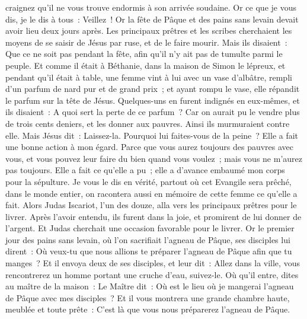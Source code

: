 \begin{multicols}{2}
craignez qu'il ne vous trouve endormis à son arrivée soudaine.
Or ce que je vous dis, je le dis à tous~: Veillez~!
\VerseOne{}Or la fête de Pâque et des pains sans levain devait avoir lieu deux jours après. Les principaux prêtres et les scribes cherchaient les moyens de se saisir de Jésus par ruse, et de le faire mourir.
Mais ils disaient~: Que ce ne soit pas pendant la fête, afin qu'il n'y ait pas de tumulte parmi le peuple.
Et comme il était à Béthanie, dans la maison de Simon le lépreux, et pendant qu'il était à table, une femme vint à lui avec un vase d'albâtre, rempli d'un parfum de nard pur et de grand prix~; et ayant rompu le vase, elle répandit le parfum sur la tête de Jésus.
Quelques-uns en furent indignés en eux-mêmes, et ils disaient~: A quoi sert la perte de ce parfum~?
Car on aurait pu le vendre plus de trois cents deniers, et les donner aux pauvres. Ainsi ils murmuraient contre elle.
Mais Jésus dit~: Laissez-la. Pourquoi lui faites-vous de la peine~? Elle a fait une bonne action à mon égard.
Parce que vous aurez toujours des pauvres avec vous, et vous pouvez leur faire du bien quand vous voulez~; mais vous ne m'aurez pas toujours.
Elle a fait ce qu'elle a pu~; elle a d'avance embaumé mon corps pour la sépulture.
Je vous le dis en vérité, partout où cet Evangile sera prêché, dans le monde entier, on racontera aussi en mémoire de cette femme ce qu'elle a fait.
Alors Judas Iscariot, l'un des douze, alla vers les principaux prêtres pour le livrer.
Après l'avoir entendu, ils furent dans la joie, et promirent de lui donner de l'argent. Et Judas cherchait une occasion favorable pour le livrer.
Or le premier jour des pains sans levain, où l'on sacrifiait l'agneau de Pâque, ses disciples lui dirent~: Où veux-tu que nous allions te préparer l'agneau de Pâque afin que tu manges~?
Et il envoya deux de ses disciples, et leur dit~: Allez dans la ville, vous rencontrerez un homme portant une cruche d'eau, suivez-le.
Où qu'il entre, dites au maître de la maison~: Le Maître dit~: Où est le lieu où je mangerai l'agneau de Pâque avec mes disciples~?
Et il vous montrera une grande chambre haute, meublée et toute prête~: C'est là que vous nous préparerez l'agneau de Pâque.

\end{multicols}
